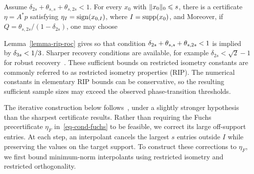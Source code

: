 \begin{thm}\label{thm-rip-dualcertif}
Assume $\delta_{2s}+\theta_{s,s}+\theta_{s,2s}<1$. For every $x_0$ with $\lVert x_0\rVert_0\leqslant s$, there is a certificate $\eta=A^*p$ satisfying $\eta_I=\operatorname{sign}(x_{0,I})$, where $I=\operatorname{supp}(x_0)$, and
Moreover, if $Q=\theta_{s,2s}/(1-\delta_{2s})$, one may choose
\end{thm}

Lemma~\ref{lemma-rip-roc} gives
so that condition $\delta_{2s}+\theta_{s,s}+\theta_{s,2s}<1$ is implied by $\delta_{3s}<1/3$. Sharper recovery conditions are available, for example $\delta_{2s}<\sqrt2-1$ for robust recovery~\cite{candes-cras}.
%
These sufficient bounds on restricted isometry constants are commonly referred to as restricted isometry properties (RIP).
%
The numerical constants in elementary RIP bounds can be conservative, so the resulting sufficient sample sizes may exceed the observed phase-transition thresholds.

The iterative construction below follows~\cite{CandesTao2005Decoding}, under a slightly stronger hypothesis than the sharpest certificate results. Rather than requiring the Fuchs precertificate $\eta_F$ in~\eqref{eq-cond-fuchs} to be feasible, we correct its large off-support entries. At each step, an interpolant cancels the largest $s$ entries outside $I$ while preserving the values on the target support.
%
To construct these corrections to $\eta_F$, we first bound minimum-norm interpolants using restricted isometry and restricted orthogonality.


